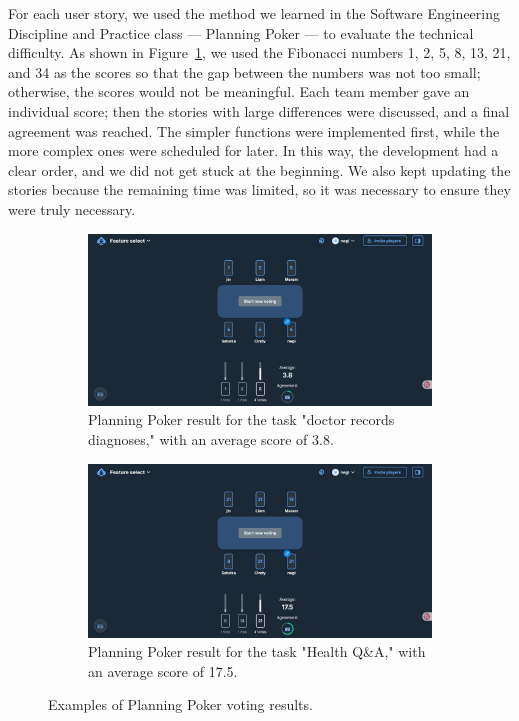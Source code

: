 For each user story, we used the method we learned in the Software Engineering Discipline and Practice class — Planning Poker — to evaluate the technical difficulty. As shown in Figure~\ref{fig:planning_poker_examples}, we used the Fibonacci numbers 1, 2, 5, 8, 13, 21, and 34 as the scores so that the gap between the numbers was not too small; otherwise, the scores would not be meaningful. Each team member gave an individual score; then the stories with large differences were discussed, and a final agreement was reached. The simpler functions were implemented first, while the more complex ones were scheduled for later. In this way, the development had a clear order, and we did not get stuck at the beginning. We also kept updating the stories because the remaining time was limited, so it was necessary to ensure they were truly necessary.

\begin{figure}[h]
   \centering
   \begin{subfigure}[t]{0.45\textwidth}
     \centering
     \includegraphics[width=\linewidth]{../../images/planning_poker_low.jpeg}
     \caption{Planning Poker result for the task "doctor records diagnoses," with an average score of 3.8.}
   \end{subfigure}%
   \hfill
   \begin{subfigure}[t]{0.45\textwidth}
     \centering
     \includegraphics[width=\linewidth]{../../images/planning_poker_high.jpg}
     \caption{Planning Poker result for the task "Health Q\&A," with an average score of 17.5.}
   \end{subfigure}
   \caption{Examples of Planning Poker voting results.}
   \label{fig:planning_poker_examples}
\end{figure}

